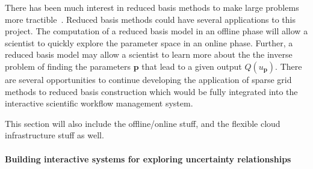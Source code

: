 \documentclass[a4paper,fontsize=12pt]{scrartcl}
\begin{document}
There has been much interest in reduced basis methods to make large
problems more tractible~\cite{LiebermanEtal2010}. %
Reduced basis methods could have several applications to this project.
The computation of a reduced basis model in an offline phase
will allow a scientist to quickly explore the parameter space in an online
phase.
Further, a reduced basis model may allow a scientist to learn more about the 
the inverse problem of finding the parameters $\mathbf{p}$ that lead to a 
given output $Q(u_{\mathbf{p}})$.
There are several opportunities to continue developing the application 
of sparse grid methods to reduced basis construction which would be
fully integrated into the interactive scientific workflow management system.




This section will also include the offline/online stuff, and the
flexible cloud infrastructure stuff as well.

\paragraph*{Building interactive systems for exploring uncertainty relationships}\mbox{}\\
\end{document}
